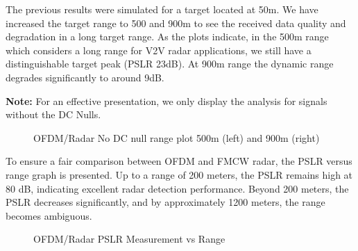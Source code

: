 \documentclass[conference]{IEEEtran}
\begin{document}
The previous results were simulated for a target located at 50m. We have increased the target range to 500 and 900m to see the received data quality and degradation in a long target range. As the plots indicate, in the 500m range which considers a long range for V2V radar applications, we still have a distinguishable target peak (PSLR 23dB). At 900m range the dynamic range degrades significantly to around 9dB. \par
\textbf{ Note: } For an effective presentation, we only display the analysis for signals without the DC Nulls.
\begin{figure}[H]
\centering
{}
\caption{OFDM/Radar No DC null range plot 500m (left) and 900m (right)}
\end{figure} 
To ensure a fair comparison between OFDM and FMCW radar, the PSLR versus range graph is presented. Up to a range of 200 meters, the PSLR remains high at 80 dB, indicating excellent radar detection performance. Beyond 200 meters, the PSLR decreases significantly, and by approximately 1200 meters, the range becomes ambiguous.
\begin{figure}[H]
\centering
{}
\caption{OFDM/Radar PSLR Measurement vs Range}
\end{figure} 
\end{document}
